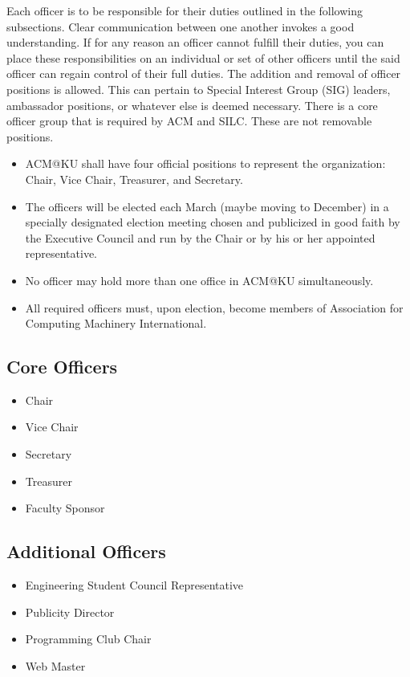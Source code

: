 Each officer is to be responsible for their duties outlined in the following subsections. Clear communication between one another invokes a good understanding. If for any reason an officer cannot fulfill their duties, you can place these responsibilities on an individual or set of other officers until the said officer can regain control of their full duties. The addition and removal of officer positions is allowed. This can pertain to Special Interest Group (SIG) leaders, ambassador positions, or whatever else is deemed necessary. There is a core officer group that is required by ACM and SILC. These are not removable positions.
\begin{itemize}
	\item ACM@KU shall have four official positions to represent the organization: Chair, Vice Chair, Treasurer, and Secretary.
	\item The officers will be elected each March (maybe moving to December) in a specially designated election meeting chosen and publicized in good faith by the Executive Council and run by the Chair or by his or her appointed representative.
	\item No officer may hold more than one office in ACM@KU simultaneously.
	\item All required officers must, upon election, become members of Association for Computing Machinery International.
\end{itemize}

\subsection{Core Officers}
\label{subsec:subsec01}

\begin{itemize}
	\item Chair
   \item Vice Chair
   \item Secretary
   \item Treasurer
   \item Faculty Sponsor
\end{itemize}

\subsection{Additional Officers}
\label{subsec:subsec02}

\begin{itemize}
	\item Engineering Student Council Representative
   \item Publicity Director
   \item Programming Club Chair
   \item Web Master
\end{itemize}

